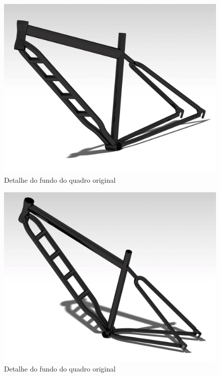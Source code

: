 	\graphicspath{{figuras/}}
	\begin{figure}[h!]
		\centering
		\includegraphics[scale=0.05]{inter_render_2.jpg}
		\caption{Detalhe do fundo do quadro original}
		\label{img:inter_render_2}
	\end{figure}

	\graphicspath{{figuras/}}
	\begin{figure}[h!]
		\centering
		\includegraphics[scale=0.05]{inter_render_1.jpg}
		\caption{Detalhe do fundo do quadro original}
		\label{img:inter_render_1}
	\end{figure}
	
